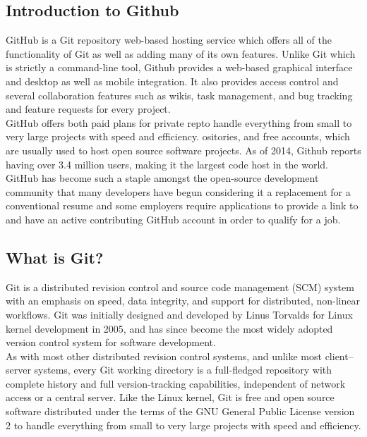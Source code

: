 \subsection{Introduction to Github}
\noindent GitHub is a Git repository web-based hosting service which offers all of the functionality of Git as well as adding many of its own features. Unlike Git which is strictly a command-line tool, Github provides a web-based graphical interface and desktop as well as mobile integration. It also provides access control and several collaboration features such as wikis, task management, and bug tracking and feature requests for every project.\\

\noindent GitHub offers both paid plans for private repto handle everything from small to very large projects with speed and efficiency. ositories, and free accounts, which are usually used to host open source software projects. As of 2014, Github reports having over 3.4 million users, making it the largest code host in the world.\\

\noindent GitHub has become such a staple amongst the open-source development community that many developers have begun considering it a replacement for a conventional resume and some employers require applications to provide a link to and have an active contributing GitHub account in order to qualify for a job.

\subsection{What is Git?}
\noindent Git is a distributed revision control and source code management (SCM) system with an emphasis on speed, data integrity, and support for distributed, non-linear workflows. Git was initially designed and developed by Linus Torvalds for Linux kernel development in 2005, and has since become the most widely adopted version control system for software development.\\

\noindent As with most other distributed revision control systems, and unlike most client–server systems, every Git working directory is a full-fledged repository with complete history and full version-tracking capabilities, independent of network access or a central server. Like the Linux kernel, Git is free and open source software distributed under the terms of the GNU General Public License version 2 to handle everything from small to very large projects with speed and efficiency.\\

